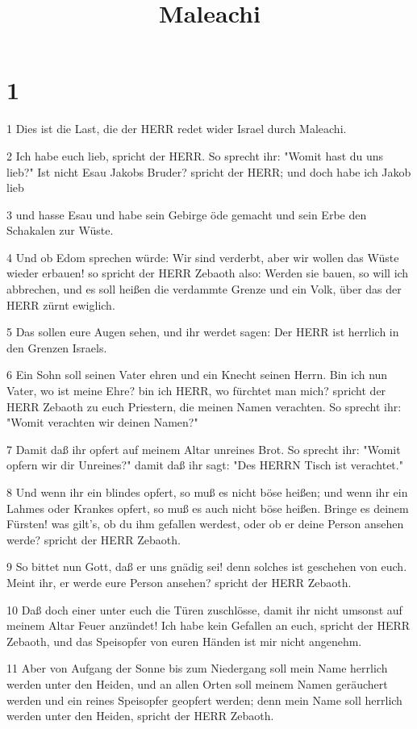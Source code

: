 

\title{Maleachi}


\chapter{1}

\par 1 Dies ist die Last, die der HERR redet wider Israel durch Maleachi.
\par 2 Ich habe euch lieb, spricht der HERR. So sprecht ihr: "Womit hast du uns lieb?" Ist nicht Esau Jakobs Bruder? spricht der HERR; und doch habe ich Jakob lieb
\par 3 und hasse Esau und habe sein Gebirge öde gemacht und sein Erbe den Schakalen zur Wüste.
\par 4 Und ob Edom sprechen würde: Wir sind verderbt, aber wir wollen das Wüste wieder erbauen! so spricht der HERR Zebaoth also: Werden sie bauen, so will ich abbrechen, und es soll heißen die verdammte Grenze und ein Volk, über das der HERR zürnt ewiglich.
\par 5 Das sollen eure Augen sehen, und ihr werdet sagen: Der HERR ist herrlich in den Grenzen Israels.
\par 6 Ein Sohn soll seinen Vater ehren und ein Knecht seinen Herrn. Bin ich nun Vater, wo ist meine Ehre? bin ich HERR, wo fürchtet man mich? spricht der HERR Zebaoth zu euch Priestern, die meinen Namen verachten. So sprecht ihr: "Womit verachten wir deinen Namen?"
\par 7 Damit daß ihr opfert auf meinem Altar unreines Brot. So sprecht ihr: "Womit opfern wir dir Unreines?" damit daß ihr sagt: "Des HERRN Tisch ist verachtet."
\par 8 Und wenn ihr ein blindes opfert, so muß es nicht böse heißen; und wenn ihr ein Lahmes oder Krankes opfert, so muß es auch nicht böse heißen. Bringe es deinem Fürsten! was gilt's, ob du ihm gefallen werdest, oder ob er deine Person ansehen werde? spricht der HERR Zebaoth.
\par 9 So bittet nun Gott, daß er uns gnädig sei! denn solches ist geschehen von euch. Meint ihr, er werde eure Person ansehen? spricht der HERR Zebaoth.
\par 10 Daß doch einer unter euch die Türen zuschlösse, damit ihr nicht umsonst auf meinem Altar Feuer anzündet! Ich habe kein Gefallen an euch, spricht der HERR Zebaoth, und das Speisopfer von euren Händen ist mir nicht angenehm.
\par 11 Aber von Aufgang der Sonne bis zum Niedergang soll mein Name herrlich werden unter den Heiden, und an allen Orten soll meinem Namen geräuchert werden und ein reines Speisopfer geopfert werden; denn mein Name soll herrlich werden unter den Heiden, spricht der HERR Zebaoth.
